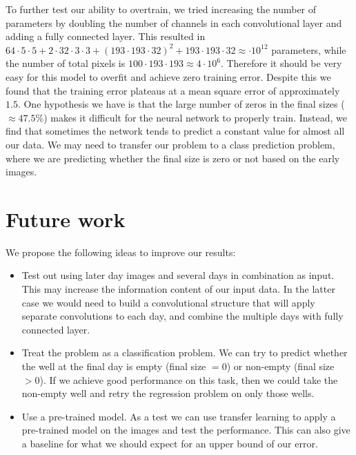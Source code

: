 \documentclass[10pt,twocolumn,letterpaper]{article}
\begin{document}
To further test our ability to overtrain, we tried increasing the number of parameters by doubling the number of channels in each convolutional layer and adding a fully connected layer.  This resulted in $64 \cdot 5 \cdot 5 + 2 \cdot 32 \cdot 3 \cdot 3 + (193 \cdot 193 \cdot 32)^2 + 193 \cdot 193 \cdot 32 \approx \cdot 10^{12}$ parameters, while the number of total pixels is $100 \cdot 193 \cdot 193 \approx 4 \cdot 10^{6}$.  Therefore it should be very easy for this model to overfit and achieve zero training error.  Despite this we found that the training error plateaus at a mean square error of approximately $1.5$.  One hypothesis we have is that the large number of zeros in the final sizes ($\approx 47.5 \%$) makes it difficult for the neural network to properly train.  Instead, we find that sometimes the network tends to predict a constant value for almost all our data.  We may need to transfer our problem to a class prediction problem, where we are predicting whether the final size is zero or not based on the early images.  



\section{Future work}

We propose the following ideas to improve our results:
\begin{itemize}
\item Test out using later day images and several days in combination as input.  This may increase the information content of our input data.  In the latter case we would need to build a convolutional structure that will apply separate convolutions to each day, and combine the multiple days with fully connected layer.
\item Treat the problem as a classification problem.  We can try to predict whether the well at the final day is empty (final size $= 0$) or non-empty (final size $> 0$).  If we achieve good performance on this task, then we could take the non-empty well and retry the regression problem on only those wells.
\item Use a pre-trained model.  As a test we can use transfer learning to apply a pre-trained model on the images and test the performance.  This can also give a baseline for what we should expect for an upper bound of our error.
\end{itemize}
\end{document}

